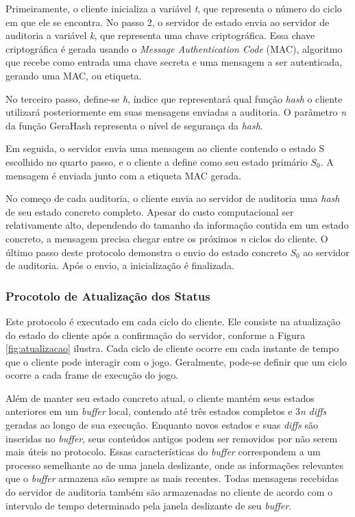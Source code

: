 Primeiramente, o cliente inicializa a variável \textit{t}, que representa o número do ciclo em que ele se encontra. No passo 2, o servidor de estado envia ao servidor de auditoria a variável \textit{k}, que representa uma chave criptográfica. Essa chave criptográfica é gerada usando o \textit{Message Authentication Code} (MAC), algoritmo que recebe como entrada uma chave secreta e uma mensagem a ser autenticada, gerando uma MAC, ou etiqueta\cite{Krawczyk:1997:HKM:RFC2104}.

No terceiro passo, define-se \textit{h}, índice que representará qual função \textit{hash} o cliente utilizará posteriormente em suas mensagens enviadas a auditoria. O parâmetro \textit{n} da função GeraHash representa o nível de segurança da \textit{hash}. 

Em seguida, o servidor envia uma mensagem ao cliente contendo o estado S escolhido no quarto passo, e o cliente a define como seu estado primário $S_0$. A mensagem é enviada junto com a etiqueta MAC gerada.

No começo de cada auditoria, o cliente envia ao servidor de auditoria uma \textit{hash} de seu estado concreto completo. Apesar do custo computacional ser relativamente alto, dependendo do tamanho da informação contida em um estado concreto, a mensagem precisa chegar entre os próximos \textit{n} ciclos do cliente. O último passo deste protocolo demonstra o envio do estado concreto $S_0$ ao servidor de auditoria. Após o envio, a inicialização é finalizada.


\subsubsection{Procotolo de Atualização dos Status}

Este protocolo é executado em cada ciclo do cliente. Ele consiste na atualização do estado do cliente após a confirmação do servidor, conforme a Figura \ref{fig:atualizacao} ilustra. Cada ciclo de cliente ocorre em cada instante de tempo que o cliente pode interagir com o jogo. Geralmente, pode-se definir que um ciclo ocorre a cada frame de execução do jogo.

Além de manter seu estado concreto atual, o cliente mantém seus estados anteriores em um \textit{buffer} local, contendo até três estados completos e 3\textit{n} \textit{diffs} geradas ao longo de sua execução. Enquanto novos estados e suas \textit{diffs} são inseridas no \textit{buffer}, seus conteúdos antigos podem ser removidos por não serem mais úteis no protocolo. Essas características do \textit{buffer} correspondem a um processo semelhante ao de uma janela deslizante, onde as informações relevantes que o \textit{buffer} armazena são sempre as mais recentes. Todas mensagens recebidas do servidor de auditoria também são armazenadas no cliente de acordo com o intervalo de tempo determinado pela janela deslizante de seu \textit{buffer}.

